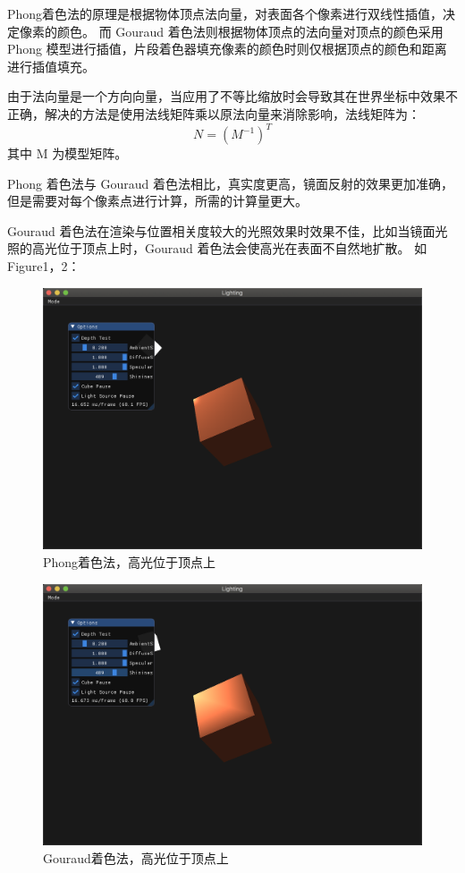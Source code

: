 \documentclass[12pt]{article}
\begin{document}
\begin{enumerate}
    Phong着色法的原理是根据物体顶点法向量，对表面各个像素进行双线性插值，决定像素的颜色。
    而 Gouraud 着色法则根据物体顶点的法向量对顶点的颜色采用 Phong 模型进行插值，片段着色器填充像素的颜色时则仅根据顶点的颜色和距离进行插值填充。

    由于法向量是一个方向向量，当应用了不等比缩放时会导致其在世界坐标中效果不正确，解决的方法是使用法线矩阵乘以原法向量来消除影响，法线矩阵为：
    \begin{equation}
        \label{normal}
        N = (M^{-1})^T
    \end{equation}
    其中 M 为模型矩阵。

    Phong 着色法与 Gouraud 着色法相比，真实度更高，镜面反射的效果更加准确，但是需要对每个像素点进行计算，所需的计算量更大。

    Gouraud 着色法在渲染与位置相关度较大的光照效果时效果不佳，比如当镜面光照的高光位于顶点上时，Gouraud 着色法会使高光在表面不自然地扩散。
    如Figure1，2：

    \begin{figure}[H]
        \centering
        \includegraphics[scale=0.3]{phong1.png}
        \caption{Phong着色法，高光位于顶点上}
        \label{fig: phong1}
    \end{figure}

    \begin{figure}[H]
        \centering
        \includegraphics[scale=0.3]{gouraud1.png}
        \caption{Gouraud着色法，高光位于顶点上}
        \label{fig: phong1}
    \end{figure}


\end{enumerate}
\end{document}
